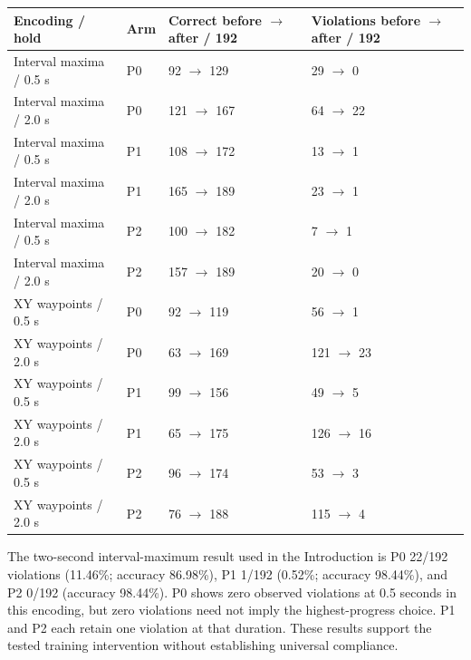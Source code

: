 \documentclass[11pt,a4paper]{article}
\begin{document}
\clearpage
\begin{longtable}{p{.25\linewidth}p{.19\linewidth}p{.24\linewidth}p{.24\linewidth}}\toprule

\textbf{Encoding / hold} & \textbf{Arm} & \textbf{Correct before $\rightarrow$ after / 192} & \textbf{Violations before $\rightarrow$ after / 192} \\ \midrule\endhead

Interval maxima / 0.5 s & P0 & 92 $\rightarrow$ 129 & 29 $\rightarrow$ 0 \\

Interval maxima / 2.0 s & P0 & 121 $\rightarrow$ 167 & 64 $\rightarrow$ 22 \\

Interval maxima / 0.5 s & P1 & 108 $\rightarrow$ 172 & 13 $\rightarrow$ 1 \\

Interval maxima / 2.0 s & P1 & 165 $\rightarrow$ 189 & 23 $\rightarrow$ 1 \\

Interval maxima / 0.5 s & P2 & 100 $\rightarrow$ 182 & 7 $\rightarrow$ 1 \\

Interval maxima / 2.0 s & P2 & 157 $\rightarrow$ 189 & 20 $\rightarrow$ 0 \\

XY waypoints / 0.5 s & P0 & 92 $\rightarrow$ 119 & 56 $\rightarrow$ 1 \\

XY waypoints / 2.0 s & P0 & 63 $\rightarrow$ 169 & 121 $\rightarrow$ 23 \\

XY waypoints / 0.5 s & P1 & 99 $\rightarrow$ 156 & 49 $\rightarrow$ 5 \\

XY waypoints / 2.0 s & P1 & 65 $\rightarrow$ 175 & 126 $\rightarrow$ 16 \\

XY waypoints / 0.5 s & P2 & 96 $\rightarrow$ 174 & 53 $\rightarrow$ 3 \\

XY waypoints / 2.0 s & P2 & 76 $\rightarrow$ 188 & 115 $\rightarrow$ 4 \\

\bottomrule\end{longtable}

The two-second interval-maximum result used in the Introduction is P0 22/192 violations (11.46\%; accuracy 86.98\%), P1 1/192 (0.52\%; accuracy 98.44\%), and P2 0/192 (accuracy 98.44\%). P0 shows zero observed violations at 0.5 seconds in this encoding, but zero violations need not imply the highest-progress choice. P1 and P2 each retain one violation at that duration. These results support the tested training intervention without establishing universal compliance.\par
\end{document}
